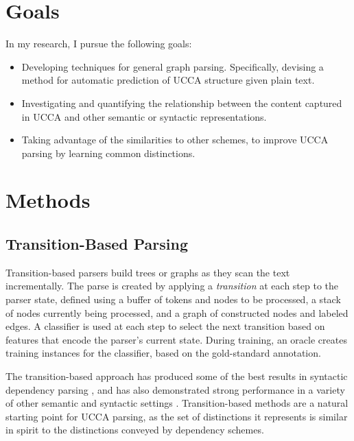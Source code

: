 \documentclass[12pt]{report}
\begin{document}
\section{Goals}\label{sec:goals}

In my research, I pursue the following goals:

\begin{itemize}
  \item Developing techniques for general graph parsing.
    Specifically, devising a method for automatic prediction of UCCA
    structure given plain text.
  \item Investigating and quantifying the relationship between the content
    captured in UCCA and other semantic or syntactic representations.
  \item Taking advantage of the similarities to other schemes,
    to improve UCCA parsing by learning common distinctions.
\end{itemize}


\section{Methods}\label{sec:methods}

\subsection{Transition-Based Parsing}\label{sec:transition_based}

Transition-based parsers \cite{Nivre03anefficient} build trees or graphs
as they scan the text incrementally.
The parse is created by applying a \textit{transition} at each step to the parser state,
defined using a buffer of tokens and nodes to be processed,
a stack of nodes currently being processed,
and a graph of constructed nodes and labeled edges.
A classifier is used at each step to select the next transition based on features
that encode the parser's current state.
During training, an oracle creates training instances for the classifier,
based on the gold-standard annotation.

The transition-based approach has produced some of the best
results in syntactic dependency parsing
\cite{kiperwasser2016simple,andor2016globally}, and has also demonstrated
strong performance in a variety of other semantic and syntactic settings
\cite{maier2015discontinuous,damonte-17}.
Transition-based methods are a natural starting point for UCCA parsing,
as the set of distinctions it represents is similar in spirit to the distinctions
conveyed by dependency schemes.
\end{document}
